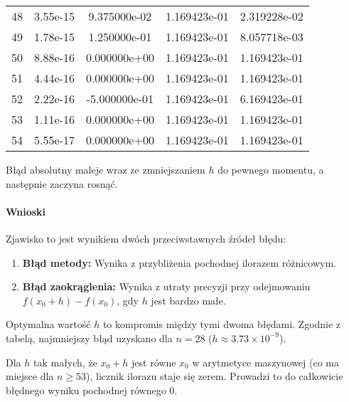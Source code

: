 \documentclass[a4paper,12pt]{article}
\begin{document}
\begin{center}
\begin{tabular}{c c c c c}
48 & 3.55e-15 & 9.375000e-02 & 1.169423e-01 & 2.319228e-02 \\
49 & 1.78e-15 & 1.250000e-01 & 1.169423e-01 & 8.057718e-03 \\
50 & 8.88e-16 & 0.000000e+00 & 1.169423e-01 & 1.169423e-01 \\
51 & 4.44e-16 & 0.000000e+00 & 1.169423e-01 & 1.169423e-01 \\
52 & 2.22e-16 & -5.000000e-01 & 1.169423e-01 & 6.169423e-01 \\
53 & 1.11e-16 & 0.000000e+00 & 1.169423e-01 & 1.169423e-01 \\
54 & 5.55e-17 & 0.000000e+00 & 1.169423e-01 & 1.169423e-01 \\
\hline
\end{tabular}
\end{center}

Błąd absolutny maleje wraz ze zmniejszaniem $h$ do pewnego momentu, a następnie zaczyna rosnąć.

\paragraph{Wnioski}
Zjawisko to jest wynikiem dwóch przeciwstawnych źródeł błędu:
\begin{enumerate}
    \item \textbf{Błąd metody:} Wynika z przybliżenia pochodnej ilorazem różnicowym.
    \item \textbf{Błąd zaokrąglenia:} Wynika z utraty precyzji przy odejmowaniu $f(x_0+h) - f(x_0)$, gdy $h$ jest bardzo małe.
\end{enumerate}
Optymalna wartość $h$ to kompromis między tymi dwoma błędami. Zgodnie z tabelą, najmniejszy błąd uzyskano dla $n=28$ ($h \approx 3.73 \times 10^{-9}$).

Dla $h$ tak małych, że $x_0+h$ jest równe $x_0$ w arytmetyce maszynowej (co ma miejsce dla $n \ge 53$), licznik ilorazu staje się zerem. Prowadzi to do całkowicie błędnego wyniku pochodnej równego 0.
\end{document}
